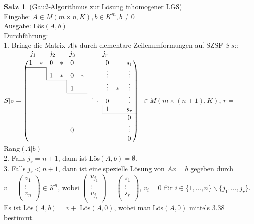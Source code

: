 \documentclass[10pt,a4paper,numbers=endperiod]{scrartcl}
\theoremstyle{definition}
\newtheorem{satz}{Satz}[section]
\begin{document}
\begin{satz}
	(Gauß-Algorithmus zur Lösung inhomogener LGS)\\
	Eingabe: $A \in M(m \times n, K), b \in K^m, b\neq 0$\\
	Ausgabe: Lös$(A,b)$\\
	Durchführung:\\
	1. Bringe die Matrix $A|b$ durch elementare Zeilenumformungen auf SZSF $S|s$::\\
	$\hspace*{11,5mm}\begin{array}{ccccccccc}
		j_1&&j_2&&j_3&&&&j_r\\
	\end{array}$\\
	$ S|s= \begin{pmatrix}
		1&*&0&*&0&&&0&&s_1\\
		\cline{1-2}
		&&\multicolumn{1}{|c}{1}&*&0&*&&\vdots&&\vdots\\
		\cline{3-4}
		&&&&\multicolumn{1}{|c}{1}&&&\vdots&*&\vdots\\
		\cline{5-6} 
		&&&&&&\ddots&0&&\vdots\\
		&&&&&&&\multicolumn{1}{|c}{1}&&s_r\\
		\cline{8-10}
		&&&&&&&&&0\\
		&&&&0&&&&&\vdots\\
		&&&&&&&&&0\\
	\end{pmatrix}$ $\in M(m \times (n+1),K)$, $r=$ Rang$(A|b)$\\
	2. Falls $j_r=n+1$, dann ist Lös$(A,b)=\emptyset$.\\
	3. Falls $j_r<n+1$, dann ist eine spezielle Lösung von $Ax=b$ gegeben durch $v=\begin{pmatrix}
	v_1\\
	\vdots\\
	v_n\\
	\end{pmatrix} \in K^n$, wobei $\begin{pmatrix}
		v_{j_1}\\
		\vdots\\
		v_{j_r}\\
	\end{pmatrix} = \begin{pmatrix}
	s_1\\
	\vdots\\
	s_r\\
	\end{pmatrix}$, $v_i = 0$ für $i \in \{1,\ldots,n\} \backslash \{j_1,\ldots,j_r\}$.\\
	Es ist Lös$(A,b) = v+$ Lös$(A,0)$, wobei man Lös$(A,0)$ mittels 3.38 bestimmt. 
\end{satz}
\end{document}

